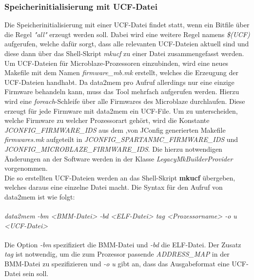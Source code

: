 \subsubsection{Speicherinitialisierung mit UCF-Datei}
Die Speicherinitialisierung mit einer UCF-Datei findet statt, wenn ein Bitfile über die Regel \textit{"all"} erzeugt werden soll. Dabei wird eine weitere Regel namens \textit{\$(UCF)} aufgerufen, welche dafür sorgt, dass alle relevanten UCF-Dateien aktuell sind und diese dann über das Shell-Skript \textit{mkucf} zu einer Datei zusammengefasst werden. Um UCF-Dateien für Microblaze-Prozessoren einzubinden, wird eine neues Makefile mit dem Namen \textit{firmware\_mb.mk} erstellt, welches die Erzeugung der UCF-Dateien handhabt. Da data2mem pro Aufruf allerdings nur eine einzige Firmware behandeln kann, muss das Tool mehrfach aufgerufen werden. Hierzu wird eine \textit{foreach}-Schleife über alle Firmwares des Microblaze durchlaufen. Diese erzeugt für jede Firmware mit data2mem ein UCF-File. Um zu unterscheiden, welche Firmware zu welcher Prozessorart gehört, wird die Konstante \textit{JCONFIG\_FIRMWARE\_IDS} aus dem ,von JConfig generierten Makefile \textit{firmwares.mk} aufgeteilt in \textit{JCONFIG\_SPARTANMC\_FIRMWARE\_IDS} und \textit{JCONFIG\_MICROBLAZE\_FIRMWARE\_IDS}. Die hierzu notwendigen Änderungen an der Software werden in der Klasse \textit{LegacyMkBuilderProvider} vorgenommen.\\
Die so erstellten UCF-Dateien werden an das Shell-Skript \textbf{mkucf} übergeben, welches daraus eine einzelne Datei macht. Die Syntax für den Aufruf von data2mem ist wie folgt:\\\\
\indent
\textit{data2mem -bm <BMM-Datei> -bd <ELF-Datei> tag <Prozessorname> -o u <UCF-Datei>}\\\\
Die Option \textit{-bm} spezifiziert die BMM-Datei und \textit{-bd} die ELF-Datei. Der Zusatz \textit{tag} ist notwendig, um die zum Prozessor passende \textit{ADDRESS\_MAP} in der BMM-Datei zu spezifizieren und \textit{-o u} gibt an, dass das Ausgabeformat eine UCF-Datei sein soll.

